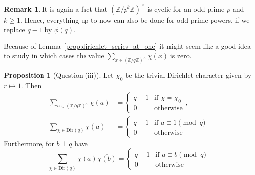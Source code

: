 \documentclass{scrartcl}
\newcommand{\Z}{\mathbb{Z}}
\newcommand{\units}{\times}
\theoremstyle{definition}
\newtheorem{remark}[definition]{Remark}
\newtheorem{proposition}[definition]{Proposition}
\begin{document}
\begin{remark}
    It is again a fact that $(\Z/p^k\Z)^\units$ is cyclic for an odd prime $p$ and $k \geq 1$.
    Hence, everything up to now can also be done for odd prime powers, if we replace $q - 1$ by $\phi(q)$.
\end{remark}
Because of Lemma~\ref{prop:dirichlet_series_at_one} it might seem like a good idea to study in which cases the value $\sum_{x \in (\Z/q\Z)^\units} \chi(x)$ is zero.
\begin{proposition}[Question (iii)]
    \label{prop:finite_sums_characters}
    Let $\chi_0$ be the trivial Dirichlet character given by $r \mapsto 1$.
    Then
    \begin{align*}
        \sum_{a \in (\Z/q\Z)^\units} \chi(a) &= \begin{cases}
            q - 1 & \text{if $\chi = \chi_0$} \\
            0 & \text{otherwise}
        \end{cases}, \\
        \sum_{\chi \in \mathrm{Dir}(q)} \chi(a) &= \begin{cases}
            q - 1 & \text{if $a \equiv 1 \pmod q$} \\
            0 & \text{otherwise}
        \end{cases}
    \end{align*}
    Furthermore, for $b \perp q$ have
    \begin{equation*}
        \sum_{\chi \in \mathrm{Dir}(q)} \chi(a)\overline{\chi(b)} = \begin{cases}
            q - 1 & \text{if $a \equiv b \pmod q$} \\
            0 & \text{otherwise}
        \end{cases}
    \end{equation*}
\end{proposition}
\end{document}
